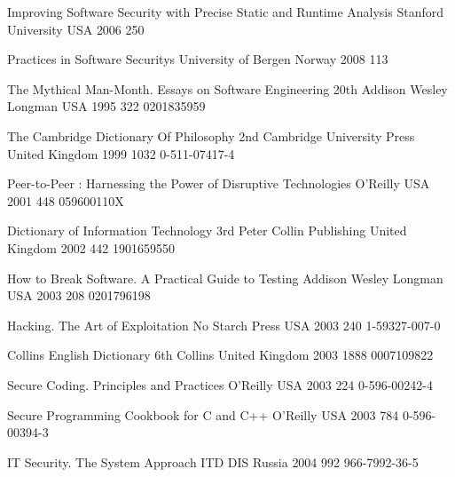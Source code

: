 \begin{thebibliography}{9}
		{}
		{Improving Software Security with Precise Static and Runtime Analysis}
		{Stanford University}
		{USA}
		{2006}
		{250}
	
		{}
		{Practices in Software Securitys}
		{University of Bergen}
		{Norway}
		{2008}
		{113}


		{}
		{The Mythical Man-Month. Essays on Software Engineering}
		{20th}
		{Addison Wesley Longman}
		{USA}
		{1995}
		{322}
		{0201835959}
	
		{}
		{The {C}ambridge {D}ictionary Of {P}hilosophy}
		{2nd}
		{Cambridge University Press}
		{United Kingdom}
		{1999}
		{1032}
		{0-511-07417-4}
	
		{}
		{Peer-to-Peer : Harnessing the Power of Disruptive Technologies}
		{}
		{O'Reilly}
		{USA}
		{2001}
		{448}
		{059600110X}
		
		{} %
		{Dictionary of {I}nformation {T}echnology}
		{3rd}
		{Peter Collin Publishing}
		{United Kingdom}
		{2002}
		{442}
		{1901659550}
		
		{}
		{How to Break Software. A Practical Guide to Testing}
		{}
		{Addison Wesley Longman}
		{USA}
		{2003}
		{208}
		{0201796198}
	
		{}
		{Hacking. The Art of Exploitation}
		{}
		{No Starch Press}
		{USA}
		{2003}
		{240}
		{1-59327-007-0}
	
		{}
		{Collins {E}nglish {D}ictionary}
		{6th}
		{Collins}
		{United Kingdom}
		{2003}
		{1888}
		{0007109822}
	
		{
			\biband
			}
		{Secure Coding. Principles and Practices}
		{}
		{O'Reilly}
		{USA}
		{2003}
		{224}
		{0-596-00242-4}
	
		{
			\biband
			}
		{Secure Programming Cookbook for {C} and {C++}}
		{}
		{O'Reilly}
		{USA}
		{2003}
		{784}
		{0-596-00394-3}
	
		{}
		{{IT} Security. The System Approach}
		{}
		{ITD DIS}
		{Russia}
		{2004}
		{992}
		{966-7992-36-5}
	

\end{thebibliography}
